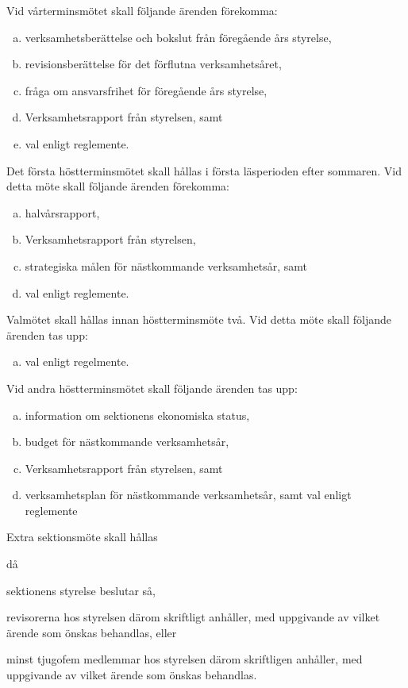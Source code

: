 \documentclass[stadgar]{dsekprotokoll}
\begin{document}
\begin{stadgeavsnitt}

Vid vårterminsmötet skall följande ärenden förekomma:
\begin{enumerate}[a)]
\item verksamhetsberättelse och bokslut från föregående års styrelse,
\item revisionsberättelse för det förflutna verksamhetsåret,
\item fråga om ansvarsfrihet för föregående års styrelse,
\item Verksamhetsrapport från styrelsen, samt
\item val enligt reglemente.
\end{enumerate}


Det första höstterminsmötet skall hållas i första läsperioden efter sommaren. Vid detta möte skall följande ärenden förekomma:
\begin{enumerate}[a)]
\item halvårsrapport,
\item Verksamhetsrapport från styrelsen,
\item strategiska målen för nästkommande verksamhetsår, samt
\item val enligt reglemente.
\end{enumerate}


Valmötet skall hållas innan höstterminsmöte två. Vid detta möte skall följande ärenden tas upp:
\begin{enumerate}[a)]
\item val enligt regelmente.
\end{enumerate}


Vid andra höstterminsmötet skall följande ärenden tas upp:
\begin{enumerate}[a)]
\item information om sektionens ekonomiska status,
\item budget för nästkommande verksamhetsår,
\item Verksamhetsrapport från styrelsen, samt
\item verksamhetsplan för nästkommande verksamhetsår, samt val enligt reglemente
\end{enumerate}


Extra sektionsmöte skall hållas
\begin{fetlista}{då}
\item sektionens styrelse beslutar så,
\item revisorerna hos styrelsen därom skriftligt anhåller, med
  uppgivande av vilket ärende som önskas behandlas, eller
\item minst tjugofem medlemmar hos styrelsen därom skriftligen
  anhåller, med uppgivande av vilket ärende som önskas behandlas.
\end{fetlista}


\end{stadgeavsnitt}
\end{document}
